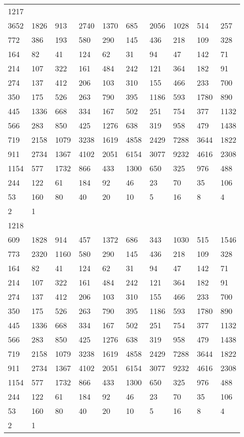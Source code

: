 \begin{longtable}{*{10}{l}}
1217&&&&&&&&&\\
3652& 1826& 913& 2740& 1370& 685& 2056& 1028& 514& 257\\
772& 386& 193& 580& 290& 145& 436& 218& 109& 328\\
164& 82& 41& 124& 62& 31& 94& 47& 142& 71\\
214& 107& 322& 161& 484& 242& 121& 364& 182& 91\\
274& 137& 412& 206& 103& 310& 155& 466& 233& 700\\
350& 175& 526& 263& 790& 395& 1186& 593& 1780& 890\\
445& 1336& 668& 334& 167& 502& 251& 754& 377& 1132\\
566& 283& 850& 425& 1276& 638& 319& 958& 479& 1438\\
719& 2158& 1079& 3238& 1619& 4858& 2429& 7288& 3644& 1822\\
911& 2734& 1367& 4102& 2051& 6154& 3077& 9232& 4616& 2308\\
1154& 577& 1732& 866& 433& 1300& 650& 325& 976& 488\\
244& 122& 61& 184& 92& 46& 23& 70& 35& 106\\
53& 160& 80& 40& 20& 10& 5& 16& 8& 4\\
2& 1& \\

1218&&&&&&&&&\\
609& 1828& 914& 457& 1372& 686& 343& 1030& 515& 1546\\
773& 2320& 1160& 580& 290& 145& 436& 218& 109& 328\\
164& 82& 41& 124& 62& 31& 94& 47& 142& 71\\
214& 107& 322& 161& 484& 242& 121& 364& 182& 91\\
274& 137& 412& 206& 103& 310& 155& 466& 233& 700\\
350& 175& 526& 263& 790& 395& 1186& 593& 1780& 890\\
445& 1336& 668& 334& 167& 502& 251& 754& 377& 1132\\
566& 283& 850& 425& 1276& 638& 319& 958& 479& 1438\\
719& 2158& 1079& 3238& 1619& 4858& 2429& 7288& 3644& 1822\\
911& 2734& 1367& 4102& 2051& 6154& 3077& 9232& 4616& 2308\\
1154& 577& 1732& 866& 433& 1300& 650& 325& 976& 488\\
244& 122& 61& 184& 92& 46& 23& 70& 35& 106\\
53& 160& 80& 40& 20& 10& 5& 16& 8& 4\\
2& 1& \\


\end{longtable}

